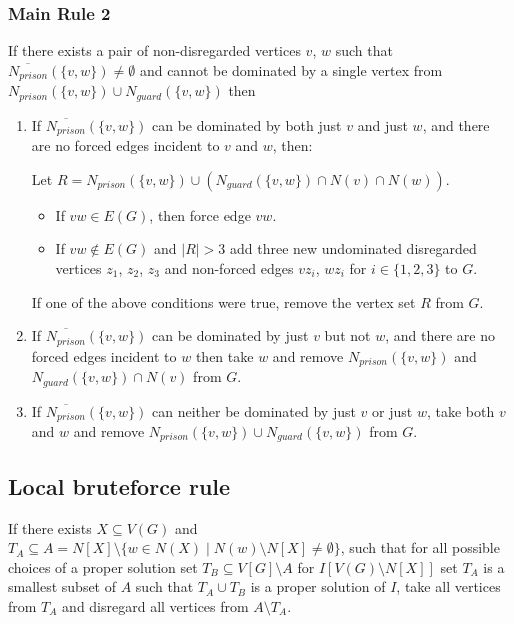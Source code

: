 \documentclass[a4paper,UKenglish,cleveref, autoref, thm-restate]{lipics-v2021}
\begin{document}
\subsubsection{Main Rule 2}
If there exists a pair of non-disregarded vertices $v$, $w$ such that $\overline{N_{prison}}(\{v, w\}) \neq \emptyset$ and cannot be dominated by a single vertex from $N_{prison}(\{v, w\}) \cup N_{guard}(\{v, w\})$ then
\begin{enumerate}
\item If $\overline{N_{prison}}(\{v, w\})$ can be dominated by both just $v$ and just $w$,
 and there are no forced edges incident to $v$ and $w$, then:


    Let $R = N_{prison}(\{v, w\}) \cup (N_{guard}(\{v, w\}) \cap N(v) \cap N(w))$.
    \begin{itemize}
        \item If $v w \in E(G)$, then force edge $v w$.
        \item If $v w \notin E(G)$ and $|R| > 3$ add three new undominated disregarded vertices $z_1$, $z_2$, $z_3$ and non-forced edges $v z_i$, $w z_i$ for $i \in \{1, 2, 3\}$ to $G$.
    \end{itemize} 
    If one of the above conditions were true, remove the vertex set $R$ from $G$. 
\item If $\overline{N_{prison}}(\{v, w\})$ can be dominated by just $v$ but not $w$, and there are no forced edges incident to $w$ then take $w$ and remove $N_{prison}(\{v, w\})$ and $N_{guard}(\{v, w\}) \cap N(v)$ from $G$.
\item  If $\overline{N_{prison}}(\{v, w\})$ can neither be dominated by just $v$ or just $w$, take both $v$ and $w$ and remove $N_{prison}(\{v, w\}) \cup N_{guard}(\{v, w\})$ from $G$.

\end{enumerate}

\subsection{Local bruteforce rule}
If there exists $X \subseteq V(G)$ and $T_A \subseteq A = N[X] \setminus \{w \in N(X) \mid N (w) \setminus N [X] \neq \emptyset \}$, such that for all possible choices of a proper solution set $T_B \subseteq V[G] \setminus A$ for $I[V(G) \setminus N[X]]$
set $T_A$ is a smallest subset of $A$ such that $T_A \cup T_B$ is a proper solution of $I$,
take all vertices from $T_A$ and disregard all vertices  from $ A \setminus T_A$. 
\end{document}
